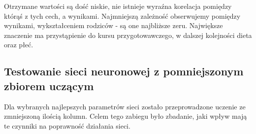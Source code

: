 \documentclass[12pt]{article}
\begin{document}
Otrzymane wartości są dość niskie, nie istnieje wyraźna korelacja pomiędzy którąś z tych cech, a wynikami. Najmniejszą zależność obserwujemy pomiędzy wynikami, wykształceniem rodziców - są one najbliższe zeru. Największe znaczenie ma przystąpienie do kursu przygotowawczego, w dalszej kolejności dieta oraz płeć.


\subsection{Testowanie sieci neuronowej z pomniejszonym zbiorem uczącym}
Dla wybranych najlepszych parametrów sieci zostało przeprowadzone uczenie ze zmniejszoną ilością kolumn. Celem tego zabiegu było zbadanie, jaki wpływ mają te czynniki na poprawność działania sieci. %
\end{document}
